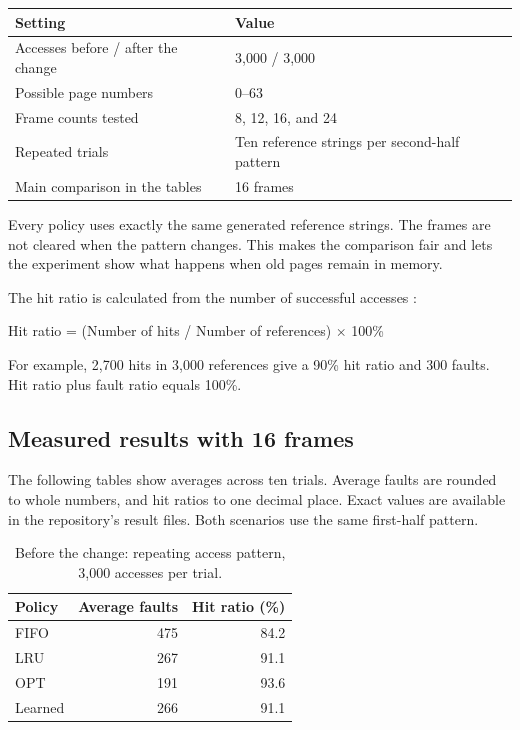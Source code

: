 \documentclass[11pt,a4paper]{article}
\begin{document}
\begin{center}
\begin{tabular}{|p{5cm}|p{7.8cm}|}\hline
Setting & Value \\ \hline
Accesses before / after the change & 3,000 / 3,000 \\ \hline
Possible page numbers & 0--63 \\ \hline
Frame counts tested & 8, 12, 16, and 24 \\ \hline
Repeated trials & Ten reference strings per second-half pattern \\ \hline
Main comparison in the tables & 16 frames \\ \hline
\end{tabular}
\end{center}

Every policy uses exactly the same generated reference strings. The frames are
not cleared when the pattern changes. This makes the comparison fair and lets
the experiment show what happens when old pages remain in memory.

The hit ratio is calculated from the number of successful accesses \cite{ostep}:
\begin{center}
Hit ratio = (Number of hits / Number of references) $\times$ 100\%
\end{center}
For example, 2,700 hits in 3,000 references give a 90\% hit ratio and 300 faults.
Hit ratio plus fault ratio equals 100\%.

\subsection{Measured results with 16 frames}
The following tables show averages across ten trials. Average faults are rounded
to whole numbers, and hit ratios to one decimal place. Exact values are available
in the repository's result files. Both scenarios use the same first-half pattern.

\begin{table}[h]
\centering\small
\caption{Before the change: repeating access pattern, 3,000 accesses per trial.}
\begin{tabular}{|l|r|r|}\hline
Policy & Average faults & Hit ratio (\%) \\ \hline
FIFO & 475 & 84.2 \\ \hline
LRU & 267 & 91.1 \\ \hline
OPT & 191 & 93.6 \\ \hline
Learned & 266 & 91.1 \\ \hline
\end{tabular}
\end{table}
\end{document}
